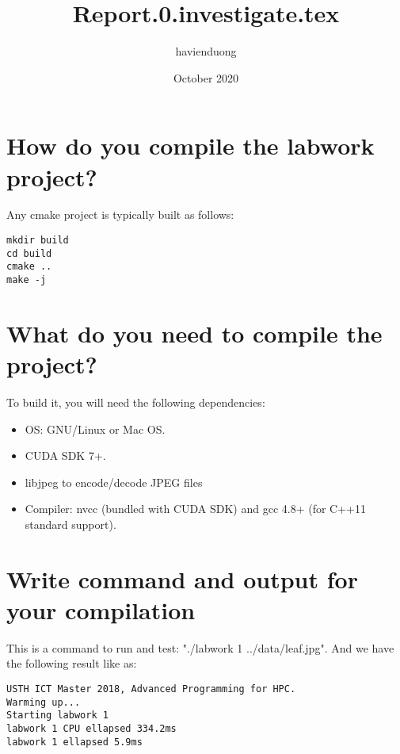 \documentclass{article}
\title{Report.0.investigate.tex}
\author{havienduong }
\date{October 2020}
\begin{document}
\maketitle

\section{How do you compile the labwork project?}

Any cmake project is typically built as follows:
{\begin{verbatim}
mkdir build
cd build
cmake ..
make -j
\end{verbatim}}



\section{What do you need to compile the project?}
To build it, you will need the following dependencies:
\begin{itemize}
    \item OS: GNU/Linux or Mac OS.
    \item CUDA SDK 7+.
    \item libjpeg to encode/decode JPEG files
    \item Compiler: nvcc (bundled with CUDA SDK) and gcc 4.8+ (for C++11 standard support).
\end{itemize}
\section{Write command and output for your compilation}
This is a command to run and test: "./labwork 1 ../data/leaf.jpg". And we have the following result like as:
\begin{verbatim}
USTH ICT Master 2018, Advanced Programming for HPC.
Warming up...
Starting labwork 1
labwork 1 CPU ellapsed 334.2ms
labwork 1 ellapsed 5.9ms
\end{verbatim}
\end{document}
